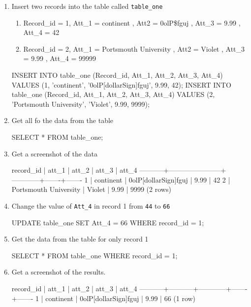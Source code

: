 \begin{enumerate}
\item Insert two records into the table called \verb|table_one|
\begin{enumerate}
    \item Record\_id = 1, Att\_1 = continent , Att2 = 0olP\$fguj , Att\_3 = 9.99 , Att\_4 = 42
    \item Record\_id = 2, Att\_1 = Portsmouth University , Att2 = Violet , Att\_3 = 9.99 , Att\_4 = 99999
\end{enumerate}
\begin{sql}
INSERT INTO table_one (Record_id, Att_1, Att_2, Att_3, Att_4) VALUES (1, 'continent', '0olP[dollarSign]fguj', 9.99, 42);
INSERT INTO table_one (Record_id, Att_1, Att_2, Att_3, Att_4) VALUES (2, 'Portsmouth University', 'Violet', 9.99, 9999);
\end{sql}
\item Get all fo the data from the table
\begin{sql}
SELECT * FROM table_one;
\end{sql}
\item Get a screenshot of the data
\begin{pseudo*}
 record_id |         att_1         |   att_2    | att_3 | att_4
-----------+-----------------------+------------+-------+-------
         1 | continent             | 0olP[dollarSign]fguj  |  9.99 |    42
         2 | Portsmouth University | Violet     |  9.99 |  9999
(2 rows)
\end{pseudo*}
\item Change the value of \verb|Att_4| in record 1 from \verb|44| to \verb|66|
\begin{sql}
UPDATE table_one SET Att_4 = 66 WHERE record_id = 1;
\end{sql}
\item Get the data from the table for only record 1
\begin{sql}
SELECT * FROM table_one WHERE record_id = 1;
\end{sql}
\item Get a screenshot of the results.
\begin{pseudo*}
 record_id |   att_1   |   att_2    | att_3 | att_4
-----------+-----------+------------+-------+-------
         1 | continent | 0olP[dollarSign]fguj  |  9.99 |    66
(1 row)
\end{pseudo*}
\end{enumerate}